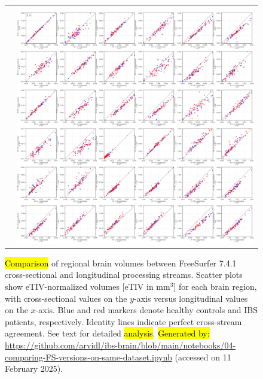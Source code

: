 \documentclass[diagnostics,article,accept,pdftex,moreauthors]{Definitions/mdpi}
\begin{document}
\begin{figure}[H]


\begin{tabular}{ll}
\hspace{-12mm} & \includegraphics[width=1.05\textwidth]{figs/fs7_cross_vs_fs7_long_version_comparison_new.png}
\end{tabular}


\caption{{{\hl{Comparison} %
 of regional brain volumes between FreeSurfer 7.4.1 cross-sectional and longitudinal processing streams}}. {Scatter plots show} eTIV-normalized volumes [eTIV in mm$^3$] for each brain region, with cross-sectional values on the $y$-axis versus longitudinal values on the $x$-axis. Blue and red markers denote healthy controls and IBS patients, respectively. Identity lines indicate perfect cross-stream agreement. See text for detailed \hl{analysis}. %
{\hl{Generated by:} {{\url{https://github.com/arvidl/ibs-brain/blob/main/notebooks/04-comparing-FS-versions-on-same-dataset.ipynb}}}} (accessed on 11 February 2025).}
\label{fig:fs7_cross_vs_fs7_long_version_comparison}
\end{figure} 
\end{document}
